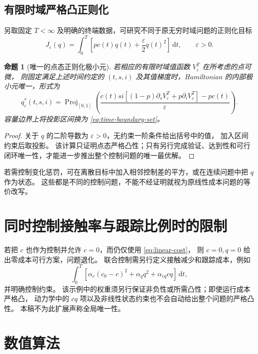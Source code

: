 \documentclass[11pt,a4paper,UTF8]{ctexart}
\newtheorem{proposition}[theorem]{命题}
\theoremstyle{definition}
\newcommand{\dd}{\,\mathrm d}
\newcommand{\proj}{\operatorname{Proj}}
\begin{document}
\subsection{有限时域严格凸正则化}
另取固定 $T<\infty$ 及明确的终端数据，可研究不同于原无穷时域问题的正则化目标
\begin{equation}
J_\varepsilon(q)=\int_0^T\left[pc(t)q(t)+\frac\varepsilon2q(t)^2\right]\dd t,
\qquad\varepsilon>0.
\label{eq:regularized-cost}
\end{equation}
\begin{proposition}[唯一的点态正则化极小元]
\label{prop:regularized-pointwise}
若相应的有限时域值函数 $V_\varepsilon^T$ 在所考虑的点可微，
则固定满足上述时间约定的 $(t,s,i)$ 及其值梯度时，Hamiltonian 的内部极小元唯一，形式为
\begin{equation}
q_\varepsilon^*(t,s,i)=\proj_{[0,1]}
\left(\frac{c(t)si[(1-p)\partial_sV_\varepsilon^T+p\partial_iV_\varepsilon^T]-pc(t)}\varepsilon\right).
\label{eq:projection-feedback}
\end{equation}
容量边界上将投影区间换为 \eqref{eq:time-boundary-set}。
\end{proposition}
\begin{proof}
关于 $q$ 的二阶导数为 $\varepsilon>0$，无约束一阶条件给出括号中的值，
加入区间约束后取投影。
该计算只证明点态严格凸性；只有另行完成验证、达到性和可行闭环唯一性，才能进一步推出整个控制问题的唯一最优解。
\end{proof}
若需控制变化惩罚，可在离散目标中加入相邻控制差的平方，或在连续问题中把 $q$ 作为状态。
这些都是不同的控制问题，不能不经证明就视为原线性成本问题的等价改写。

\section{同时控制接触率与跟踪比例时的限制}
若把 $c$ 也作为控制并允许 $c=0$，而仍仅使用 \eqref{eq:linear-cost}，
则 $c=0,q=0$ 给出零成本可行方案，问题退化。
联合控制需另行定义接触减少和跟踪成本，例如
\begin{equation}
\int_0^T[\alpha_c(c_0-c)^2+\alpha_q q^2+\alpha_{cq}cq]\dd t,
\label{eq:joint-cost}
\end{equation}
并明确控制约束。
该示例中的权重须另行保证非负性或所需凸性；即使运行成本严格凸，
动力学中的 $cq$ 项以及非线性状态约束也不会自动给出整个问题的严格凸性。
本稿不为此扩展声称全局唯一性。

\section{数值算法}
\label{sec:numerical-method}
\end{document}
